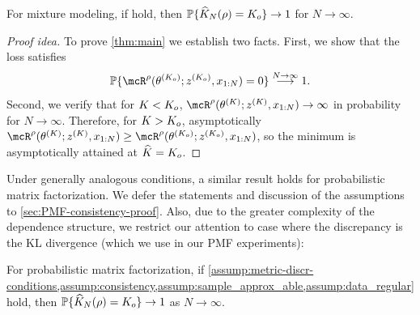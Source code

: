 \begin{theorem} \label{thm:main}
	For mixture modeling, if  hold, then $\mathbb{P}\{\widehat{K}_{N}(\rho) = K_{o}\} \to 1$ for $N \to \infty$.
\end{theorem}
\begin{proof}[Proof idea] To prove \cref{thm:main} we establish two facts.
	First, we show that the loss satisfies
	\[
		\Pr\{\mcR^{\rho}(\allparam^{(\numcomps_{o})}; z^{(\numcomps_{o})}, \data{1:\numobs}) = 0 \}   \overset{N \to \infty}{\longrightarrow}  1.
	\]
	Second, we verify that for $K < K_o$,
	$
		\mcR^{\rho}(\allparam^{(\numcomps)}; z^{(\numcomps)}, \data{1:\numobs}) \to \infty
	$
	in probability for $N \to \infty$.
	Therefore, for $K > K_o$, asymptotically
	$\mcR^{\rho}(\allparam^{(\numcomps)}; z^{(\numcomps)}, \data{1:\numobs})  \ge \mcR^{\rho}(\allparam^{(\numcomps_{o})}; z^{(\numcomps_{o})}, \data{1:\numobs})$, so the minimum is asymptotically attained at $\widehat{K}=K_o$.
\end{proof}

Under generally analogous conditions, a similar result holds for probabilistic matrix factorization.
We defer the statements and discussion of the assumptions to \cref{sec:PMF-consistency-proof}. %
Also, due to the greater complexity of the dependence structure, we restrict our attention to case where the discrepancy is the KL divergence (which we use in our PMF experiments):
\begin{theorem} \label{thm:main-pmf}
	For probabilistic matrix factorization, if \cref{assump:metric-discr-conditions,assump:consistency,assump:sample_approx_able,assump:data_regular} hold, then $\mathbb{P}\{\widehat{K}_{N}(\rho) = K_{o}\} \to 1$ as $N \to \infty$.
\end{theorem}

